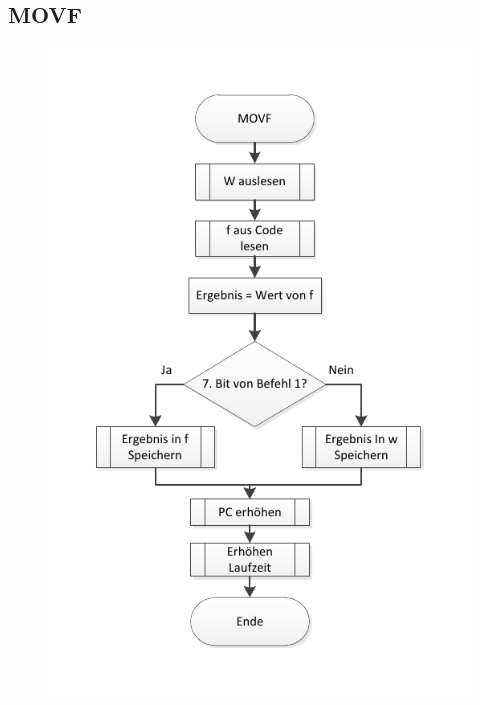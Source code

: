 \newpage
\subsection{MOVF}


\begin{figure}[h]
\centering
\includegraphics[scale=0.7]{Diag/MOVF.pdf}
\end{figure}
